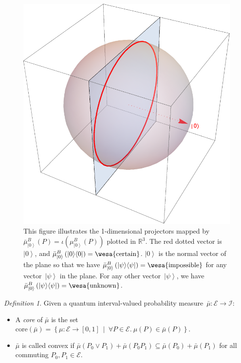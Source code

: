 \documentclass{article}
\theoremstyle{remark}
\newtheorem{definition}{Definition}
\newcommand{\events}{\ensuremath{\mathcal{E}}}
\newcommand{\pmeas}{\ensuremath{\mu}}
\newcommand{\imposs}{{\mbox{\wesa{impossible}}}}
\newcommand{\necess}{{\mbox{\wesa{certain}}}}
\newcommand{\unknown}{{\mbox{\wesa{unknown}}}}
\newcommand{\ket}[1]{{\left\vert{#1}\right\rangle}}
\newcommand{\op}[2]{\ensuremath{\left\vert{#1}\middle\rangle\middle\langle{#2}\right\vert}}
\newcommand{\proj}[1]{\op{#1}{#1}}
\newcommand{\set}[2]{\ensuremath{\left\{ {#1}~\middle|~{#2}\right\} }}
\begin{document}
\begin{figure}
\begin{centering}
\includegraphics[scale=0.38]{measure3} 
\par\end{centering}
\caption{\label{fig:three-dimensional-3-value}This figure illustrates the
1-dimensional projectors mapped by $\bar{\mu}_{\ket{0}}^{B}(P)=\iota\left(\mu_{\ket{0}}^{B}(P)\right)$
plotted in $\mathbb{R}^{3}$. The red dotted vector is $\ket{0}$,
and $\bar{\mu}_{\ket{0}}^{B}\left(\proj{0}\right)=\necess$. $\ket{0}$
is the normal vector of the plane so that we have $\bar{\mu}_{\ket{0}}^{B}\left(\proj{\psi}\right)=\imposs$
for any vector~$\ket{\psi}$ in the plane. For any other vector~$\ket{\psi}$,
we have $\bar{\mu}_{\ket{0}}^{B}\left(\proj{\psi}\right)=\unknown$.}
\end{figure}

\begin{definition} Given a quantum interval-valued probability measure~$\bar{\mu}:\events\rightarrow\mathscr{I}$: 
\begin{itemize}
\item A \emph{core} of $\bar{\mu}$ is the set $\mathrm{core}\left(\bar{\mu}\right)=\set{\pmeas:\events\rightarrow[0,1]}{\forall P\in\events.~\pmeas\left(P\right)\in\bar{\mu}\left(P\right)}$. 
\item $\bar{\mu}$ is called convex if $\bar{\mu}\left(P_{0}\vee P_{1}\right)+\bar{\mu}\left(P_{0}P_{1}\right)\subseteq\bar{\mu}\left(P_{0}\right)+\bar{\mu}\left(P_{1}\right)$
for all commuting $P_{0},P_{1}\in\events$. 
\end{itemize}
\end{definition}
\end{document}
